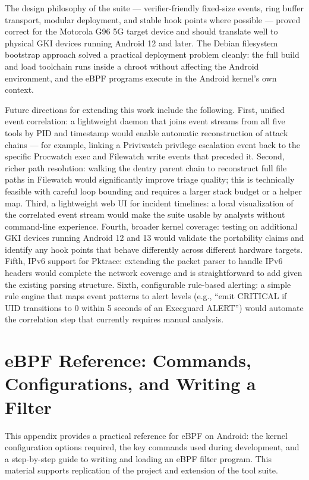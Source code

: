 \documentclass{mnitjaipur}
\begin{document}
The design philosophy of the suite — verifier-friendly fixed-size events, ring buffer transport, modular deployment, and stable hook points where possible — proved correct for the Motorola G96 5G target device and should translate well to physical GKI devices running Android 12 and later. The Debian filesystem bootstrap approach solved a practical deployment problem cleanly: the full build and load toolchain runs inside a chroot without affecting the Android environment, and the eBPF programs execute in the Android kernel's own context.

Future directions for extending this work include the following. First, unified event correlation: a lightweight daemon that joins event streams from all five tools by PID and timestamp would enable automatic reconstruction of attack chains — for example, linking a Priviwatch privilege escalation event back to the specific Procwatch exec and Filewatch write events that preceded it. Second, richer path resolution: walking the dentry parent chain to reconstruct full file paths in Filewatch would significantly improve triage quality; this is technically feasible with careful loop bounding and requires a larger stack budget or a helper map. Third, a lightweight web UI for incident timelines: a local visualization of the correlated event stream would make the suite usable by analysts without command-line experience. Fourth, broader kernel coverage: testing on additional GKI devices running Android 12 and 13 would validate the portability claims and identify any hook points that behave differently across different hardware targets. Fifth, IPv6 support for Pktrace: extending the packet parser to handle IPv6 headers would complete the network coverage and is straightforward to add given the existing parsing structure. Sixth, configurable rule-based alerting: a simple rule engine that maps event patterns to alert levels (e.g., ``emit CRITICAL if UID transitions to 0 within 5 seconds of an Execguard ALERT'') would automate the correlation step that currently requires manual analysis.

\clearpage
\appendix
\chapter{eBPF Reference: Commands, Configurations, and Writing a Filter}
\label{app:ebpf}

This appendix provides a practical reference for eBPF on Android: the kernel configuration options required, the key commands used during development, and a step-by-step guide to writing and loading an eBPF filter program. This material supports replication of the project and extension of the tool suite.
\end{document}
